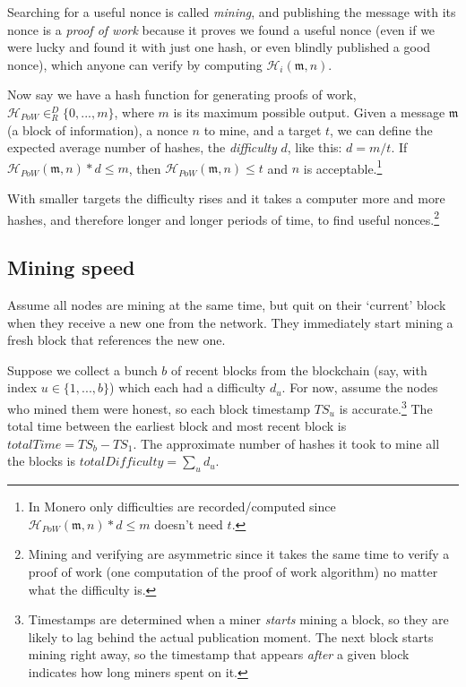 Searching for a useful nonce is called {\em mining}, and publishing the message with its nonce is a {\em proof of work} because it proves we found a useful nonce (even if we were lucky and found it with just one hash, or even blindly published a good nonce), which anyone can verify by computing $\mathcal{H}_i(\mathfrak{m},n)$.

Now say we have a hash function for generating proofs of work, $\mathcal{H}_{PoW} \in^D_R \{0,...,m\}$, where $m$ is its maximum possible output. Given a message $\mathfrak{m}$ (a block of information), a nonce $n$ to mine, and a target $t$, we can define the expected average number of hashes, the {\em difficulty} $d$, like this: $d = m/t$. If $\mathcal{H}_{PoW}(\mathfrak{m},n)*d \leq m$, then $\mathcal{H}_{PoW}(\mathfrak{m},n) \leq t$ and $n$ is acceptable.\footnote{In Monero only difficulties are recorded/computed since $\mathcal{H}_{PoW}(\mathfrak{m},n)*d \leq m$ doesn't need $t$.}

With smaller targets the difficulty rises and it takes a computer more and more hashes, and therefore longer and longer periods of time, to find useful nonces.\footnote{Mining and verifying are asymmetric since it takes the same time to verify a proof of work (one computation of the proof of work algorithm) no matter what the difficulty is.}


\subsection{Mining speed}

Assume all nodes are mining at the same time, but quit on their `current' block when they receive a new one from the network. They immediately start mining a fresh block that references the new one.

Suppose we collect a bunch $b$ of recent blocks from the blockchain (say, with index $u \in \{1,...,b\}$) which each had a difficulty $d_u$. For now, assume the nodes who mined them were honest, so each block timestamp ${TS}_u$ is accurate.\footnote{Timestamps are determined when a miner {\em starts} mining a block, so they are likely to lag behind the actual publication moment. The next block starts mining right away, so the timestamp that appears {\em after} a given block indicates how long miners spent on it.} The total time between the earliest block and most recent block is $\mathit{totalTime} = {TS}_b - {TS}_1$. The approximate number of hashes it took to mine all the blocks is $\mathit{totalDifficulty} = \sum_u d_u$.

